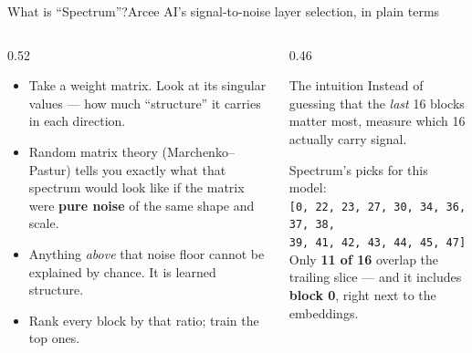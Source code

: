 \documentclass[aspectratio=169,11pt]{beamer}
\begin{document}
\begin{frame}{What is ``Spectrum''?}{Arcee AI's signal-to-noise layer selection, in plain terms}
  \begin{columns}[T]
    \begin{column}{0.52\textwidth}
      \begin{itemize}
        \item Take a weight matrix. Look at its singular values --- how much ``structure'' it carries in each direction.
        \item Random matrix theory (Marchenko--Pastur) tells you exactly what that spectrum would look like if the matrix were \textbf{pure noise} of the same shape and scale.
        \item Anything \emph{above} that noise floor cannot be explained by chance. It is learned structure.
        \item Rank every block by that ratio; train the top ones.
      \end{itemize}
    \end{column}
    \begin{column}{0.46\textwidth}
      \begin{block}{The intuition}
        Instead of guessing that the \emph{last} 16 blocks matter most, measure which 16 actually carry signal.
      \end{block}
      \vspace{0.5em}
      \small
      Spectrum's picks for this model:\\[0.3em]
      \texttt{[0, 22, 23, 27, 30, 34, 36, 37, 38,\\ \phantom{[}39, 41, 42, 43, 44, 45, 47]}\\[0.5em]
      Only \textbf{11 of 16} overlap the trailing slice --- and it includes \textbf{block 0}, right next to the embeddings.
    \end{column}
  \end{columns}
\end{frame}
\end{document}
